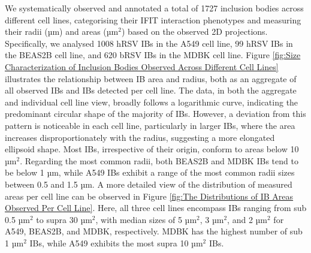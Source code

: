 We systematically observed and annotated a total of 1727 inclusion bodies across different cell lines, categorising their IFIT interaction phenotypes and measuring their radii (µm) and areas (\(\mbox{µm}^2\)) based on the observed 2D projections. Specifically, we analysed 1008 hRSV IBs in the A549 cell line, 99 hRSV IBs in the BEAS2B cell line, and 620 bRSV IBs in the MDBK cell line. Figure \ref{fig:Size Characterization of Inclusion Bodies Observed Across Different Cell Lines} illustrates the relationship between IB area and radius, both as an aggregate of all observed IBs and IBs detected per cell line. The data, in both the aggregate and individual cell line view, broadly follows a logarithmic curve, indicating the predominant circular shape of the majority of IBs. However, a deviation from this pattern is noticeable in each cell line, particularly in larger IBs, where the area increases disproportionately with the radius, suggesting a more elongated ellipsoid shape. Most IBs, irrespective of their origin, conform to areas below 10 \(\mbox{µm}^2\). Regarding the most common radii, both BEAS2B and MDBK IBs tend to be below 1 µm, while A549 IBs exhibit a range of the most common radii sizes between 0.5 and 1.5 µm. A more detailed view of the distribution of measured areas per cell line can be observed in Figure \ref{fig:The Distributions of IB Areas Observed Per Cell Line}. Here, all three cell lines encompass IBs ranging from sub 0.5 \(\mbox{µm}^2\) to supra 30 \(\mbox{µm}^2\), with median sizes of 5 \(\mbox{µm}^2\), 3 \(\mbox{µm}^2\), and 2 \(\mbox{µm}^2\) for A549, BEAS2B, and MDBK, respectively. MDBK has the highest number of sub 1 \(\mbox{µm}^2\) IBs, while A549 exhibits the most supra 10 \(\mbox{µm}^2\) IBs.

